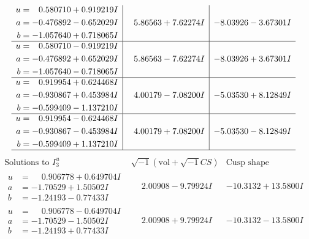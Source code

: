 \documentclass[1p]{elsarticle_modified}
\theoremstyle{definition}
\newcommand{\I}{\sqrt{-1}}
\begin{document}
$$\begin{array}{c|c|c}
\begin{aligned}
u &= \phantom{-}0.580710 + 0.919219 I \\
a &= -0.476892 - 0.652029 I \\
b &= -1.057640 + 0.718065 I\end{aligned}
 & \phantom{-}5.86563 + 7.62274 I & -8.03926 - 3.67301 I \\ \hline\begin{aligned}
u &= \phantom{-}0.580710 - 0.919219 I \\
a &= -0.476892 + 0.652029 I \\
b &= -1.057640 - 0.718065 I\end{aligned}
 & \phantom{-}5.86563 - 7.62274 I & -8.03926 + 3.67301 I \\ \hline\begin{aligned}
u &= \phantom{-}0.919954 + 0.624468 I \\
a &= -0.930867 + 0.453984 I \\
b &= -0.599409 - 1.137210 I\end{aligned}
 & \phantom{-}4.00179 - 7.08200 I & -5.03530 + 8.12849 I \\ \hline\begin{aligned}
u &= \phantom{-}0.919954 - 0.624468 I \\
a &= -0.930867 - 0.453984 I \\
b &= -0.599409 + 1.137210 I\end{aligned}
 & \phantom{-}4.00179 + 7.08200 I & -5.03530 - 8.12849 I\\
 \hline 
 \end{array}$$\newpage$$\begin{array}{c|c|c}  
\text{Solutions to }I^u_{3}& \I (\text{vol} + \sqrt{-1}CS) & \text{Cusp shape}\\
 \hline 
\begin{aligned}
u &= \phantom{-}0.906778 + 0.649704 I \\
a &= -1.70529 + 1.50502 I \\
b &= -1.24193 - 0.77433 I\end{aligned}
 & \phantom{-}2.00908 - 9.79924 I & -10.3132 + 13.5800 I \\ \hline\begin{aligned}
u &= \phantom{-}0.906778 - 0.649704 I \\
a &= -1.70529 - 1.50502 I \\
b &= -1.24193 + 0.77433 I\end{aligned}
 & \phantom{-}2.00908 + 9.79924 I & -10.3132 - 13.5800 I \\ \hline\begin{aligned}

\end{aligned}
\end{array}$$
\end{document}
